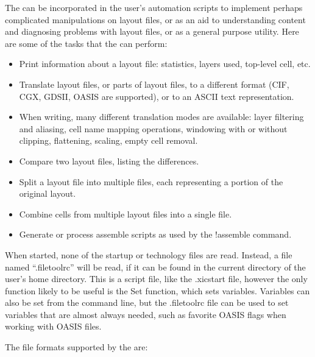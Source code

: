 The {\FileTool} can be incorporated in the user's automation scripts
to implement perhaps complicated manipulations on layout files, or as
an aid to understanding content and diagnosing problems with layout
files, or as a general purpose utility.  Here are some of the tasks
that the {\FileTool} can perform:

\begin{itemize}
\item{Print information about a layout file: statistics, layers used,
 top-level cell, etc.}
\item{Translate layout files, or parts of layout files, to a
 different format (CIF, CGX, GDSII, OASIS are supported), or to an
 ASCII text representation.}
\item{When writing, many different translation modes are available:
 layer filtering and aliasing, cell name mapping operations, windowing
 with or without clipping, flattening, scaling, empty cell removal.}
\item{Compare two layout files, listing the differences.}
\item{Split a layout file into multiple files, each representing 
 a portion of the original layout.}
\item{Combine cells from multiple layout files into a single file.}
\item{Generate or process assemble scripts as used by the {\Xic}
 {\cb !assemble} command.}
\end{itemize}

When started, none of the {\Xic} startup or technology files are
read.  Instead, a file named ``{\vt .filetoolrc}'' will be read, if
it can be found in the current directory of the user's home
directory.  This is a script file, like the {\vt .xicstart} file,
however the only function likely to be useful is the {\vt Set}
function, which sets variables.  Variables can also be set from the
{\FileTool} command line, but the {\vt .filetoolrc} file can be used
to set variables that are almost always needed, such as favorite
OASIS flags when working with OASIS files.

The file formats supported by the {\FileTool} are:

